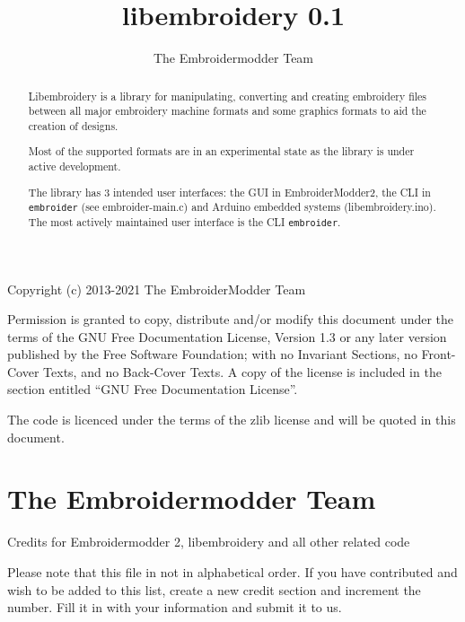 \documentclass[onesize, a4paper]{refart}
\title{libembroidery 0.1}
\author{The Embroidermodder Team}
\date{}
\begin{document}
\maketitle

\begin{abstract}
Libembroidery is a library for manipulating, converting and creating
embroidery files between all major embroidery machine formats and some
graphics formats to aid the creation of designs.

Most of the supported formats are in an experimental state as the
library is under active development.

The library has 3 intended user interfaces: the GUI in EmbroiderModder2,
the CLI in \texttt{embroider} (see embroider-main.c) and Arduino
embedded systems (libembroidery.ino). The most actively maintained user
interface is the CLI \texttt{embroider}.
\end{abstract}

\begin{small}
Copyright (c) 2013-2021 The EmbroiderModder Team

Permission is granted to copy, distribute and/or modify this document
under the terms of the GNU Free Documentation License, Version 1.3 or
any later version published by the Free Software Foundation; with no
Invariant Sections, no Front-Cover Texts, and no Back-Cover Texts. A
copy of the license is included in the section entitled ``GNU Free
Documentation License''.

The code is licenced under the terms of the zlib license and will be
quoted in this document.
\end{small}

\tableofcontents

\newpage

\section{The Embroidermodder Team}

Credits for Embroidermodder 2, libembroidery and all other related code

Please note that this file in not in alphabetical order. If you have contributed
and wish to be added to this list, create a new credit section and increment the
number. Fill it in with your information and submit it to us.
\end{document}
